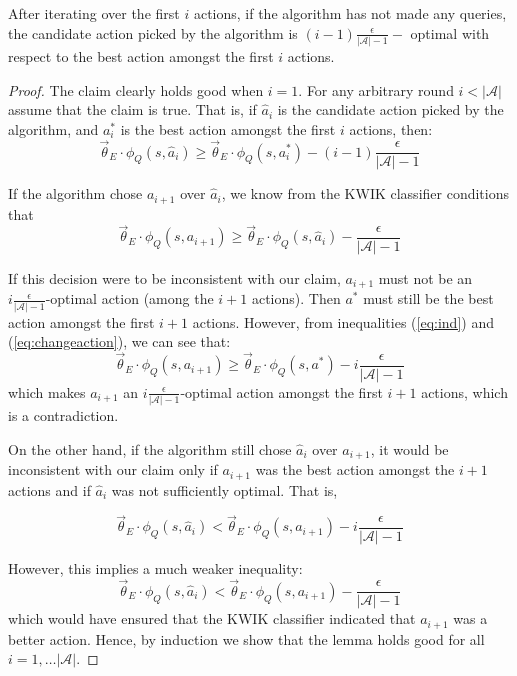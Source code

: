 \begin{lemma} After iterating over the first $i$ actions, if the algorithm has not made any queries, the candidate action picked by the algorithm is $(i-1)\displaystyle\frac{\epsilon}{|\mathcal{A}|-1}-$ optimal with respect to the best action amongst the first $i$ actions.
\end{lemma}

\begin{proof}
The claim clearly holds good when $i=1$. For any arbitrary round $i < |\mathcal{A}|$ assume that the claim is true. That is, if $\hat{a}_i$ is the candidate action picked by the algorithm, and $a_i^*$ is the best action amongst the first $i$ actions, then:
\begin{equation}\label{eq:ind}
\vec{\theta}_E\cdot \phi_Q(s,\hat{a}_i) \geq \vec{\theta}_E\cdot \phi_Q(s,a_i^*) - (i-1)\frac{\epsilon}{|\mathcal{A}|-1} 
\end{equation}

If the algorithm chose $a_{i+1}$ over $\hat{a}_i$, we know from the KWIK classifier conditions that
\begin{equation}\label{eq:changeaction}
\vec{\theta}_E\cdot \phi_Q(s,a_{i+1}) \geq \vec{\theta}_E\cdot \phi_Q(s,\hat{a}_i) - \frac{\epsilon}{|\mathcal{A}|-1}
\end{equation}


If this decision were to be inconsistent with our claim, $a_{i+1}$ must not be an $i \frac{\epsilon}{|\mathcal{A}|-1}$-optimal action (among the $i+1$ actions). Then $a^*$ must still be the best action amongst the first $i+1$ actions. However, from inequalities (\ref{eq:ind}) and (\ref{eq:changeaction}), we can see that:
\[
\vec{\theta}_E\cdot \phi_Q(s,{a}_{i+1}) \geq \vec{\theta}_E\cdot \phi_Q(s,a^*) - i\frac{\epsilon}{|\mathcal{A}|-1}
\]
which makes $a_{i+1}$ an $i \frac{\epsilon}{|\mathcal{A}|-1}$-optimal action amongst the first $i+1$ actions, which is a contradiction. 

On the other hand, if the algorithm still chose $\hat{a}_i$ over $a_{i+1}$, it would be inconsistent with our claim only if $a_{i+1}$ was the best action amongst the $i+1$ actions and if $\hat{a}_i$ was not sufficiently optimal. That is,

\begin{equation}\label{eq:notoptimal}
\vec{\theta}_E\cdot \phi_Q(s,\hat{a}_{i}) < \vec{\theta}_E\cdot \phi_Q(s,a_{i+1}) - i\frac{\epsilon}{|\mathcal{A}|-1}
\end{equation}

However, this implies a much weaker inequality:
\[
\vec{\theta}_E\cdot \phi_Q(s,\hat{a}_{i}) < \vec{\theta}_E\cdot \phi_Q(s,a_{i+1}) - \frac{\epsilon}{|\mathcal{A}|-1}
\]
which would have ensured that the KWIK classifier indicated that $a_{i+1}$
was a better action. Hence, by induction we show that the lemma holds good for all $i = 1, \hdots |\mathcal{A}|$. 

\end{proof}


